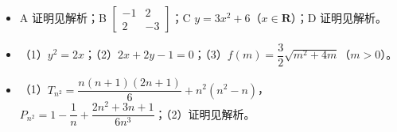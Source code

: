 \begin{itemize}[leftmargin=2.6em]
  \item[\textbf{21.}] A 证明见解析；B $\begin{bmatrix}-1&2\\2&-3\end{bmatrix}$；C $y=3x^2+6$（$x\in\mathbf R$）；D 证明见解析。
  \item[\textbf{22.}] （1）$y^2=2x$；（2）$2x+2y-1=0$；（3）$f(m)=\dfrac32\sqrt{m^2+4m}$（$m>0$）。
  \item[\textbf{23.}] （1）$T_{n^2}=\dfrac{n(n+1)(2n+1)}6+n^2(n^2-n)$，$P_{n^2}=1-\dfrac1n+\dfrac{2n^2+3n+1}{6n^3}$；（2）证明见解析。
\end{itemize}
